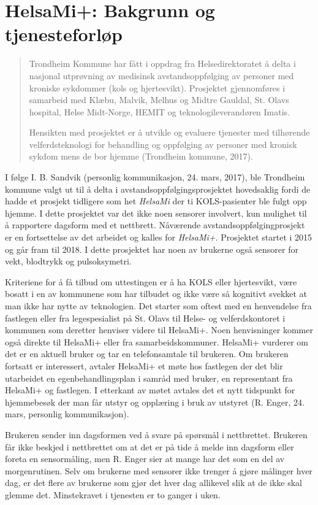 \section{HelsaMi+: Bakgrunn og tjenesteforløp}
\blockquote{
Trondheim Kommune har fått i oppdrag fra Helsedirektoratet å delta i nasjonal utprøvning av medisinsk avstandsoppfølging av personer med kroniske sykdommer (kols og
hjertesvikt). Prosjektet gjennomføres i samarbeid med Klæbu, Malvik, Melhus og Midtre Gauldal, St. Olavs hospital, Helse Midt-Norge, HEMIT og teknologileverandøren
Imatis.

Hensikten med prosjektet er å utvikle og evaluere tjenester med tilhørende velferdsteknologi for behandling og oppfølging av personer med kronisk sykdom mens de bor
hjemme (Trondheim kommune, 2017). %
}

I følge I. B. Sandvik (personlig kommunikasjon, 24. mars, 2017), ble Trondheim kommune valgt ut til å delta i avstandsoppfølgingsprosjektet hovedsaklig fordi de hadde et
prosjekt tidligere som het \textit{HelsaMi} der ti KOLS-pasienter ble fulgt opp hjemme. I dette prosjektet var det ikke noen sensorer involvert,
kun mulighet til å rapportere dagsform med et nettbrett. Nåværende avstandsoppfølgingprosjekt er en fortsettelse av det arbeidet
og kalles for \textit{HelsaMi+}. Prosjektet startet i 2015 og går fram til 2018. I dette prosjektet har noen av brukerne også sensorer
for vekt, blodtrykk og pulsoksymetri.

Kriteriene for å få tilbud om uttestingen er å ha KOLS eller hjertesvikt, være bosatt i en av kommunene som har tilbudet og ikke være så kognitivt
svekket at man ikke har nytte av teknologien. Det starter som oftest med en henvendelse fra fastlegen eller fra legespesialist på St. Olavs
til Helse- og velferdskontoret i kommunen som deretter
henviser videre til HelsaMi+. Noen henvisninger kommer også direkte til HelsaMi+ eller fra samarbeidskommuner. HelsaMi+ vurderer om det er en aktuell
bruker og tar en telefonsamtale til brukeren. Om brukeren fortsatt er interessert, avtaler HelsaMi+ et møte hos fastlegen der det blir utarbeidet en
egenbehandlingsplan i samråd med bruker, en representant fra HelsaMi+ og fastlegen. I etterkant av møtet avtales det et nytt tidspunkt for
hjemmebesøk der man får utstyr og opplæring i bruk av utstyret (R. Enger, 24. mars, personlig kommunikasjon).

Brukeren sender inn dagsformen ved å svare på spørsmål i nettbrettet.  Brukeren får ikke beskjed i nettbrettet om at det er på tide å melde inn dagsform eller foreta en sensormåling, men R. Enger
sier at mange har det som en del av morgenrutinen. Selv om brukerne med sensorer ikke trenger å gjøre målinger hver dag, er det flere av brukerne
som gjør det hver dag allikevel slik at de ikke skal glemme det. Minstekravet i tjenesten er to ganger i uken.

